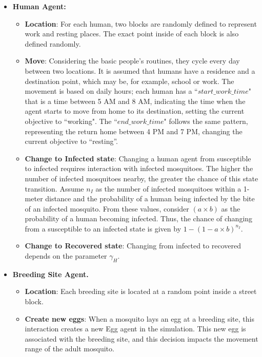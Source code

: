 \begin{itemize}
\item \textbf{Human Agent:}
  \begin{itemize}
    \item \textbf{Location}: For each human, two blocks are randomly defined to represent work and resting places. The exact point inside of each block is also defined randomly.
    \item \textbf{Move}: Considering the basic people's routines, they cycle every day between two locations. It is assumed that humans have a residence and a destination point, which may be, for example, school or work. The movement is based on daily hours; each human has a ``$start\_work\_time$" that is a time between 5 AM and 8 AM, indicating the time when the agent starts to move from home to its destination, setting the current objective to ``working". The ``$end\_work\_time$" follows the same pattern, representing the return home between 4 PM and 7 PM, changing the current objective to ``resting''.
    \item \textbf{Change to Infected state}: Changing a human agent from susceptible to infected requires interaction with infected mosquitoes. The higher the number of infected mosquitoes nearby, the greater the chance of this state transition. Assume $n_I$ as the number of infected mosquitoes within a 1-meter distance and the probability of a human being infected by the bite of an infected mosquito. From these values, consider $(a \times b)$ as the probability of a human becoming infected. Thus, the chance of changing from a susceptible to an infected state is given by $1 - (1 - a \times b)^{n_{I}}$.
    \item  \textbf{Change to Recovered state}: Changing from infected to recovered depends on the parameter $\gamma_H$.
\end{itemize}

\item \textbf{Breeding Site Agent.}
  \begin{itemize}
    \item \textbf{Location}: Each breeding site is located at a random point inside a street block.
    \item \textbf{Create new eggs}: When a mosquito lays an egg at a breeding site, this interaction creates a new Egg agent in the simulation. This new egg is associated with the breeding site, and this decision impacts the movement range of the adult mosquito. 
  \end{itemize}
  

\end{itemize}
